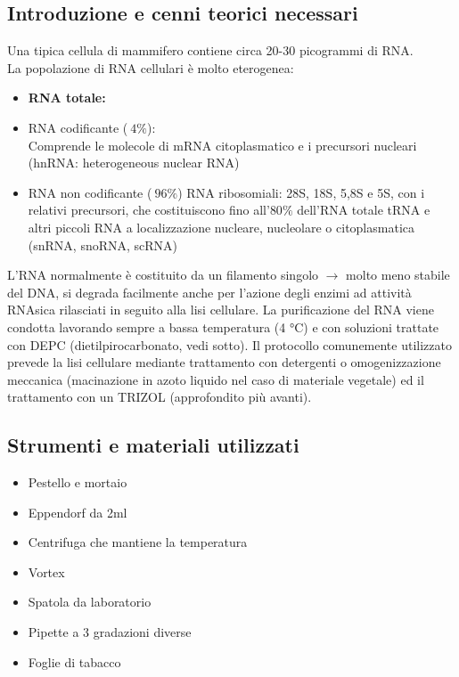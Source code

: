 \documentclass{extarticle}
\begin{document}
\subsection*{Introduzione e cenni teorici necessari} Una tipica cellula di mammifero contiene circa 20-30 picogrammi di RNA.\\La popolazione di RNA cellulari è molto eterogenea:
\begin{itemize}
    \item [] \textbf{RNA totale:}
    \item RNA codificante ($~4\%$):\\ Comprende le molecole di mRNA citoplasmatico e i precursori nucleari (hnRNA: heterogeneous nuclear RNA)
    \item RNA non codificante ($~96\%$)
        \subitem{-} RNA ribosomiali: 28S, 18S, 5,8S e 5S, con i relativi precursori, che costituiscono fino all'$80\%$ dell'RNA totale
        \subitem{-} tRNA e altri piccoli RNA a localizzazione nucleare, nucleolare o citoplasmatica (snRNA, snoRNA, scRNA)
\end{itemize}
L'RNA normalmente è costituito da un filamento singolo $\rightarrow$ molto meno stabile del DNA, si degrada facilmente anche per l'azione degli enzimi ad attività RNAsica rilasciati in seguito alla lisi cellulare.
La purificazione del RNA viene condotta lavorando sempre a bassa temperatura (4 °C) e con soluzioni trattate con DEPC (dietilpirocarbonato, vedi sotto). Il protocollo comunemente utilizzato prevede la lisi cellulare mediante
trattamento con detergenti o omogenizzazione meccanica (macinazione in azoto liquido nel caso di materiale vegetale) ed il trattamento con un TRIZOL (approfondito più avanti).
\subsection*{Strumenti e materiali utilizzati}
\begin{itemize}
    \item Pestello e mortaio
    \item Eppendorf da 2ml
    \item Centrifuga che mantiene la temperatura
    \item Vortex
    \item Spatola da laboratorio
    \item Pipette a 3 gradazioni diverse
    \item Foglie di tabacco
\end{itemize}
\end{document}
